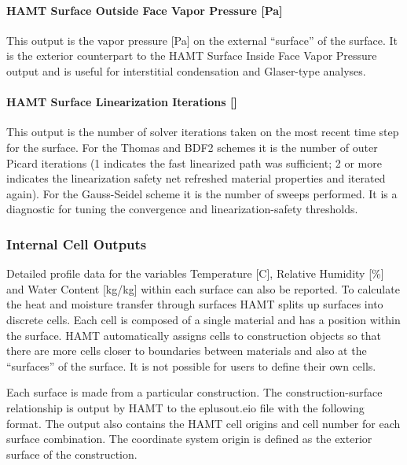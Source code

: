 \paragraph{HAMT Surface Outside Face Vapor Pressure {[}Pa{]}}\label{hamt-surface-outside-face-vapor-pressure-pa}

This output is the vapor pressure {[}Pa{]} on the external ``surface'' of the surface. It is the exterior counterpart to the HAMT Surface Inside Face Vapor Pressure output and is useful for interstitial condensation and Glaser-type analyses.

\paragraph{HAMT Surface Linearization Iterations {[}{]}}\label{hamt-surface-linearization-iterations}

This output is the number of solver iterations taken on the most recent time step for the surface. For the Thomas and BDF2 schemes it is the number of outer Picard iterations (1 indicates the fast linearized path was sufficient; 2 or more indicates the linearization safety net refreshed material properties and iterated again). For the Gauss-Seidel scheme it is the number of sweeps performed. It is a diagnostic for tuning the convergence and linearization-safety thresholds.

\subsubsection{Internal Cell Outputs}\label{internal-cell-outputs}

Detailed profile data for the variables Temperature {[}C{]}, Relative Humidity {[}\%{]} and Water Content {[}kg/kg{]} within each surface can also be reported. To calculate the heat and moisture transfer through surfaces HAMT splits up surfaces into discrete cells. Each cell is composed of a single material and has a position within the surface. HAMT automatically assigns cells to construction objects so that there are more cells closer to boundaries between materials and also at the ``surfaces'' of the surface. It is not possible for users to define their own cells.

Each surface is made from a particular construction. The construction-surface relationship is output by HAMT to the eplusout.eio file with the following format. The output also contains the HAMT cell origins and cell number for each surface combination. The coordinate system origin is defined as the exterior surface of the construction.

